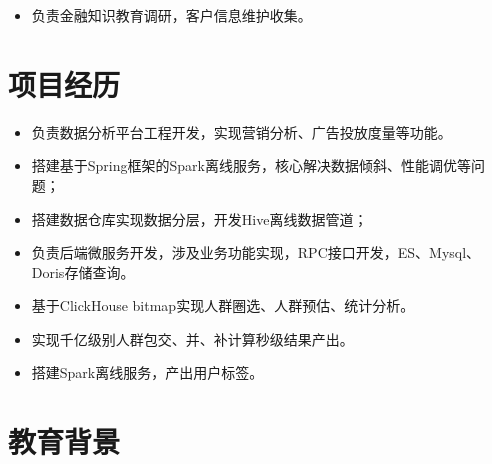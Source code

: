 \documentclass{resume}
\begin{document}
\begin{itemize}
  \item 负责金融知识教育调研，客户信息维护收集。
\end{itemize}

\section{项目经历}
\begin{itemize}
  \item 负责数据分析平台工程开发，实现营销分析、广告投放度量等功能。
  \item 搭建基于Spring框架的Spark离线服务，核心解决数据倾斜、性能调优等问题；
  \item 搭建数据仓库实现数据分层，开发Hive离线数据管道；
  \item 负责后端微服务开发，涉及业务功能实现，RPC接口开发，ES、Mysql、Doris存储查询。
\end{itemize}

\begin{itemize}
  \item 基于ClickHouse bitmap实现人群圈选、人群预估、统计分析。
  \item 实现千亿级别人群包交、并、补计算秒级结果产出。
  \item 搭建Spark离线服务，产出用户标签。
\end{itemize}

\section{教育背景}
\end{document}
